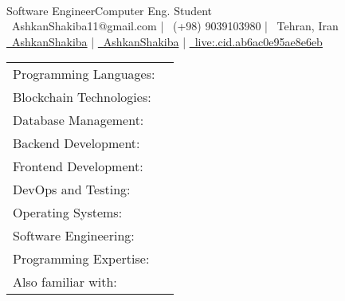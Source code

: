 \documentclass[]{awesome-cv}
\begin{document}
    
\begin{center}
	  \\
	\vspace{2mm}
	\textcolor{awesome}{Software Engineer{\enskip\cdotp\enskip}Computer Eng. Student} \\
	\vspace{2mm}
	{\faEnvelope\ AshkanShakiba11@gmail.com} | {\faMobile\ (+98) 9039103980} | {\faMapMarker\ Tehran, Iran} \\
	{\href{https://linkedin.com/in/AshkanShakiba}{\faLinkedin\ AshkanShakiba}} | {\href{https://github.com/AshkanShakiba}{\faGithub\ AshkanShakiba}} | {\href{skype:live:.cid.ab6ac0e95ae8e6eb?chat}{\faSkype\ live:.cid.ab6ac0e95ae8e6eb}}
\end{center}
\begin{cventries}
	\cventry
	{}
	{\def\arraystretch{1.15}{\begin{tabular}{ l l }
		\vspace{0.25mm}Programming Languages:  & {\skill{ Python, Java, JavaScript, TypeScript, Kotlin, C}} \\
		\vspace{0.25mm} Blockchain Technologies: & {\skill{ Solidity, Smart Contracts, Web3, Brownie, Wallet Development}} \\
		\vspace{0.25mm}Database Management:  & {\skill{ SQL, MySQL, PostgreSQL, elasticsearch, redis}} \\
		\vspace{0.25mm}Backend Development:  & {\skill{ Django, Django REST framework, CherryPy}} \\
		\vspace{0.25mm}Frontend Development:  & {\skill{ HTML, CSS, Angular, Flutter, Scss}} \\
		\vspace{0.25mm}DevOps and Testing:  & {\skill{ Git, Docker, Selenium}} \\
		\vspace{0.25mm}Operating Systems:  & {\skill{ Linux (Ubuntu), Windows}} \\
		\vspace{0.25mm}Software Engineering:  & {\skill{ Agile and Scrum, Design Patterns, Testing}} \\
		\vspace{0.25mm}Programming Expertise:  & {\skill{ Data Structures and Algorithms, Object-oriented Programming, Microservices}} \\
		\vspace{0.25mm}Also familiar with:  & {\skill{ Golang, Android Development, Flask, React, kibana}} \\
		\end{tabular}}}
	{}
	{}
	{}
\end{cventries}
\end{document}
